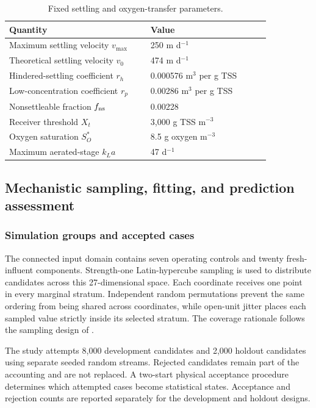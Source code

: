 \begin{table}[htbp]
\centering\small
\caption{Fixed settling and oxygen-transfer parameters.}
\label{tab:plant_settling_constants}
\begin{tabular}{p{0.46\linewidth}p{0.39\linewidth}}
\toprule Quantity & Value\\\midrule
Maximum settling velocity $v_{\max}$ & 250 m d$^{-1}$\\
Theoretical settling velocity $v_0$ & 474 m d$^{-1}$\\
Hindered-settling coefficient $r_h$ & 0.000576 m$^3$ per g TSS\\
Low-concentration coefficient $r_p$ & 0.00286 m$^3$ per g TSS\\
Nonsettleable fraction $f_{\rm ns}$ & 0.00228\\
Receiver threshold $X_t$ & 3{,}000 g TSS m$^{-3}$\\
Oxygen saturation $S_O^*$ & 8.5 g oxygen m$^{-3}$\\
Maximum aerated-stage $k_La$ & 47 d$^{-1}$\\
\bottomrule
\end{tabular}
\end{table}

\subsection{Mechanistic sampling, fitting, and prediction assessment}

\subsubsection{Simulation groups and accepted cases}

The connected input domain contains seven operating controls and twenty fresh-influent components. Strength-one Latin-hypercube sampling is used to distribute candidates across this 27-dimensional space. Each coordinate receives one point in every marginal stratum. Independent random permutations prevent the same ordering from being shared across coordinates, while open-unit jitter places each sampled value strictly inside its selected stratum. The coverage rationale follows the sampling design of \citet{McKay1979}.

The study attempts 8{,}000 development candidates and 2{,}000 holdout candidates using separate seeded random streams. Rejected candidates remain part of the accounting and are not replaced. A two-start physical acceptance procedure determines which attempted cases become statistical states. Acceptance and rejection counts are reported separately for the development and holdout designs.

